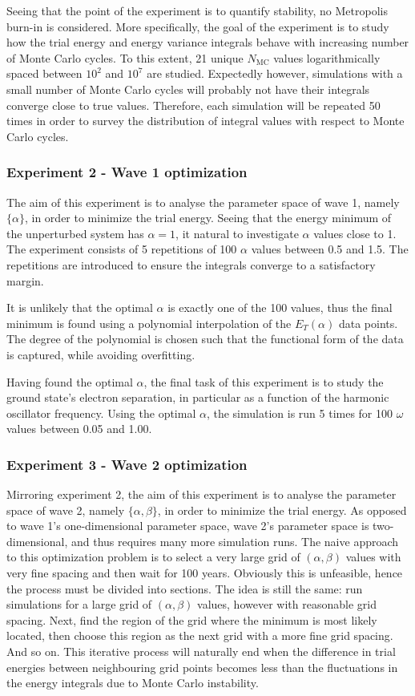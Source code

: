 \documentclass[nofootinbib,reprint,english]{revtex4-1}
\begin{document}
Seeing that the point of the experiment is to quantify stability, no Metropolis burn-in is considered. More specifically, the goal of the experiment is to study how the trial energy and energy variance integrals behave with increasing number of Monte Carlo cycles. To this extent, 21 unique \(N_\text{MC}\) values logarithmically spaced between \(10^2\) and \(10^7\) are studied. Expectedly however, simulations with a small number of Monte Carlo cycles will probably not have their integrals converge close to true values. Therefore, each simulation will be repeated 50 times in order to survey the distribution of integral values with respect to Monte Carlo cycles.
\subsubsection{Experiment 2 - Wave 1 optimization}
The aim of this experiment is to analyse the parameter space of wave 1, namely \(\{\alpha\}\), in order to minimize the trial energy. Seeing that the energy minimum of the unperturbed system has \(\alpha=1\), it natural to investigate \(\alpha\) values close to 1. The experiment consists of 5 repetitions of 100 \(\alpha\) values between 0.5 and 1.5. The repetitions are introduced to ensure the integrals converge to a satisfactory margin.

It is unlikely that the optimal \(\alpha\) is exactly one of the 100 values, thus the final minimum is found using a polynomial interpolation of the \(E_T(\alpha)\) data points. The degree of the polynomial is chosen such that the functional form of the data is captured, while avoiding overfitting.

Having found the optimal \(\alpha\), the final task of this experiment is to study the ground state's electron separation, in particular as a function of the harmonic oscillator frequency. Using the optimal \(\alpha\), the simulation is run 5 times for 100 \(\omega\) values between 0.05 and 1.00.
\subsubsection{Experiment 3 - Wave 2 optimization}
Mirroring experiment 2, the aim of this experiment is to analyse the parameter space of wave 2, namely \(\{\alpha,\beta\}\), in order to minimize the trial energy. As opposed to wave 1's one-dimensional parameter space, wave 2's parameter space is two-dimensional, and thus requires many more simulation runs. The naive approach to this optimization problem is to select a very large grid of \((\alpha,\beta)\) values with very fine spacing and then wait for 100 years. Obviously this is unfeasible, hence the process must be divided into sections. The idea is still the same: run simulations for a large grid of \((\alpha,\beta)\) values, however with reasonable grid spacing. Next, find the region of the grid where the minimum is most likely located, then choose this region as the next grid with a more fine grid spacing. And so on. This iterative process will naturally end when the difference in trial energies between neighbouring grid points becomes less than the fluctuations in the energy integrals due to Monte Carlo instability.
\end{document}

